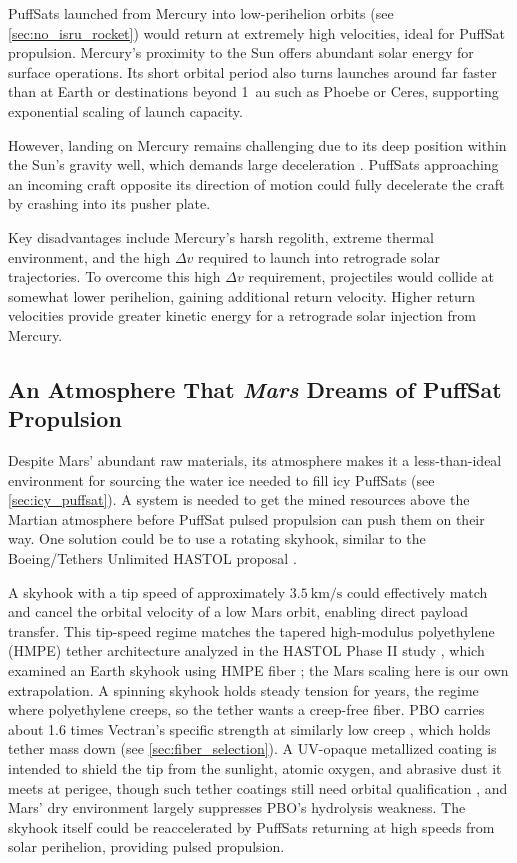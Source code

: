 \documentclass{article}
\newcommand{\deltav}{\Delta v}
\begin{document}
PuffSats launched from Mercury into low-perihelion orbits (see \autoref{sec:no_isru_rocket}) would return at extremely high velocities, ideal for PuffSat propulsion. Mercury's proximity to the Sun offers abundant solar energy for surface operations. Its short orbital period also turns launches around far faster than at Earth or destinations beyond \SI{1}{\astronomicalunit} such as Phoebe or Ceres, supporting exponential scaling of launch capacity.

However, landing on Mercury remains challenging due to its deep position within the Sun's gravity well, which demands large deceleration \cite{benkhoff2021bepicolombo}. PuffSats approaching an incoming craft opposite its direction of motion could fully decelerate the craft by crashing into its pusher plate.

Key disadvantages include Mercury's harsh regolith, extreme thermal environment, and the high $\deltav$ required to launch into retrograde solar trajectories. To overcome this high $\deltav$ requirement, projectiles would collide at somewhat lower perihelion, gaining additional return velocity.  Higher return velocities provide greater kinetic energy for a retrograde solar injection from Mercury.

\subsection{An Atmosphere That \textit{Mars} Dreams of PuffSat Propulsion}\label{sec:mars_skyhook}
Despite Mars' abundant raw materials, its atmosphere makes it a less-than-ideal environment for sourcing the water ice needed to fill icy PuffSats (see \autoref{sec:icy_puffsat}). A system is needed to get the mined resources above the Martian atmosphere before PuffSat pulsed propulsion can push them on their way. One solution could be to use a rotating skyhook, similar to the Boeing/Tethers Unlimited HASTOL proposal \cite{skyhook_hastol}.

A skyhook with a tip speed of approximately $\SI{3.5}{\kilo\meter\per\second}$ could effectively match and cancel the orbital velocity of a low Mars orbit, enabling direct payload transfer. This tip-speed regime matches the tapered high-modulus polyethylene (HMPE) tether architecture analyzed in the HASTOL Phase II study \cite{hastol_phase_ii}, which examined an Earth skyhook using HMPE fiber \cite{dyneema_sk99_datasheet}; the Mars scaling here is our own extrapolation.  A spinning skyhook holds steady tension for years, the regime where polyethylene creeps, so the tether wants a creep-free fiber. PBO carries about \num{1.6} times Vectran's specific strength at similarly low creep \cite{zylon_technical_info}, which holds tether mass down (see \autoref{sec:fiber_selection}). A UV-opaque metallized coating is intended to shield the tip from the sunlight, atomic oxygen, and abrasive dust it meets at perigee, though such tether coatings still need orbital qualification \cite{hastol_phase_ii}, and Mars' dry environment largely suppresses PBO's hydrolysis weakness.  The skyhook itself could be reaccelerated by PuffSats returning at high speeds from solar perihelion, providing pulsed propulsion.
\end{document}
